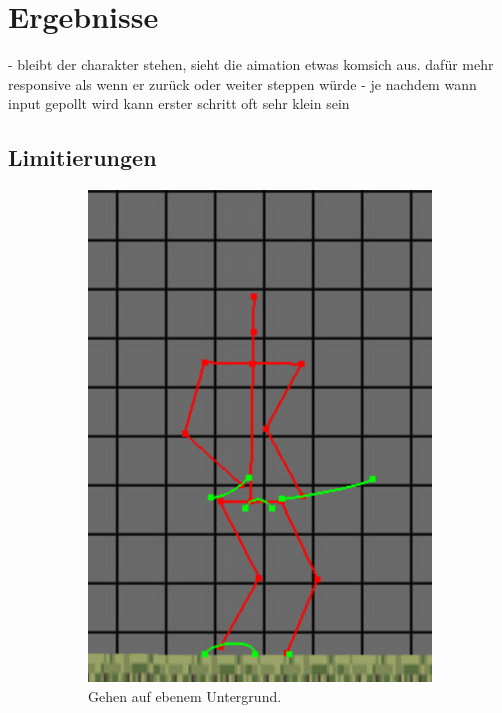 \chapter{Ergebnisse}

- bleibt der charakter stehen, sieht die aimation etwas komsich aus. dafür mehr responsive als wenn er zurück oder weiter steppen würde
- je nachdem wann input gepollt wird kann erster schritt oft sehr klein sein

\section{Limitierungen}

\begin{figure}
    \centering
    \begin{subfigure}[t]{.4\linewidth}
        \centering
        \includegraphics[width=0.75\linewidth]{images/even_ground_slow.png}
        \caption{Gehen auf ebenem Untergrund.}
        \label{even_slow}
    \end{subfigure}
    \begin{subfigure}[t]{.4\linewidth}
        \centering

\end{subfigure}
\end{figure}
